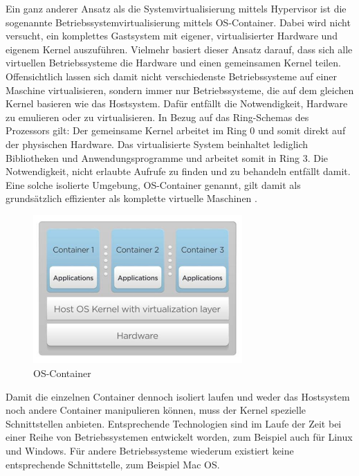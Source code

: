 Ein ganz anderer Ansatz als die Systemvirtualisierung mittels Hypervisor ist die sogenannte Betriebssystemvirtualisierung mittels OS-Container. Dabei wird nicht versucht, ein komplettes Gastsystem mit eigener, virtualisierter Hardware und eigenem Kernel auszuführen. Vielmehr basiert dieser Ansatz darauf, dass sich alle virtuellen Betriebssysteme die Hardware und einen gemeinsamen Kernel teilen. Offensichtlich lassen sich damit nicht verschiedenste Betriebssysteme auf einer Maschine virtualisieren, sondern immer nur Betriebssysteme, die auf dem gleichen Kernel basieren wie das Hostsystem. Dafür entfällt die Notwendigkeit, Hardware zu emulieren oder zu virtualisieren. In Bezug auf das Ring-Schemas des Prozessors gilt: Der gemeinsame Kernel arbeitet im Ring 0 und somit direkt auf der physischen Hardware. Das virtualisierte System beinhaltet lediglich Bibliotheken und Anwendungsprogramme und arbeitet somit in Ring 3. Die Notwendigkeit, nicht erlaubte Aufrufe zu finden und zu behandeln entfällt damit. Eine solche isolierte Umgebung, OS-Container genannt, gilt damit als grundsätzlich effizienter als komplette virtuelle Maschinen \citep[Vgl.][Introduction]{Turnball14}.

\begin{figure}[!ht]
  \begin{center}
    \includegraphics[width=8cm]{bilder/lxc-architecture.jpg}
    \caption{OS-Container \citep{Francis2014}}
  \end{center}
\end{figure}

Damit die einzelnen Container dennoch isoliert laufen und weder das Hostsystem noch andere Container manipulieren können, muss der Kernel spezielle Schnittstellen anbieten. Entsprechende Technologien sind im Laufe der Zeit bei einer Reihe von Betriebssystemen entwickelt worden, zum Beispiel auch für Linux und Windows. Für andere Betriebssysteme wiederum existiert keine entsprechende Schnittstelle, zum Beispiel Mac OS.

